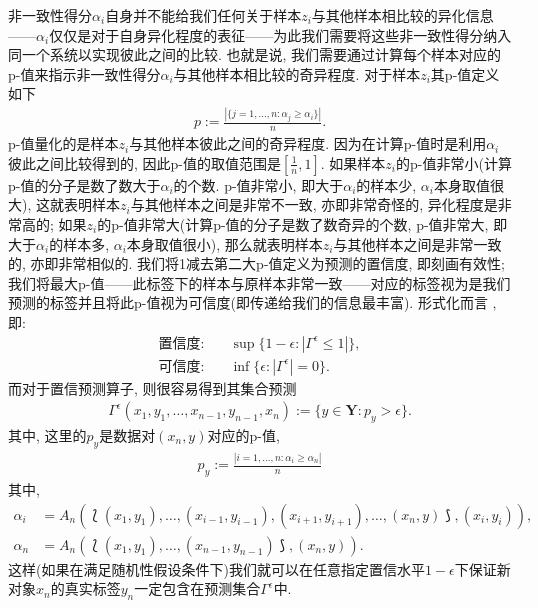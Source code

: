 非一致性得分$\alpha_{i}$自身并不能给我们任何关于样本$z_{i}$与其他样本相比较的异化信息——$\alpha_{i}$仅仅是对于自身异化程度的表征——为此我们需要将这些非一致性得分纳入同一个系统以实现彼此之间的比较. 也就是说, 我们需要通过计算每个样本对应的p-值来指示非一致性得分$\alpha_{i}$与其他样本相比较的奇异程度. 对于样本$z_{i}$其p-值定义如下
\begin{align}
\label{p-value}
p := \frac{|\{j = 1, \ldots, n: \alpha_{j} \geq \alpha_{i}\}|}{n}.
\end{align}
p-值量化的是样本$z_{i}$与其他样本彼此之间的奇异程度. 因为在计算p-值时是利用$\alpha_{i}$彼此之间比较得到的, 因此p-值的取值范围是$[\frac{1}{n}, 1]$. 如果样本$z_{i}$的p-值非常小(计算p-值的分子是数了数大于$\alpha_{i}$的个数. p-值非常小, 即大于$\alpha_{i}$的样本少, $\alpha_{i}$本身取值很大), 这就表明样本$z_{i}$与其他样本之间是非常不一致, 亦即非常奇怪的, 异化程度是非常高的; 如果$z_{i}$的p-值非常大(计算p-值的分子是数了数奇异的个数, p-值非常大, 即大于$\alpha_{i}$的样本多, $\alpha_{i}$本身取值很小), 那么就表明样本$z_{i}$与其他样本之间是非常一致的, 亦即非常相似的. 我们将1减去第二大p-值定义为预测的置信度, 即刻画有效性; 我们将最大p-值——此标签下的样本与原样本非常一致——对应的标签视为是我们预测的标签并且将此p-值视为可信度(即传递给我们的信息最丰富). 形式化而言 \citep{2006Hedging}, 即:
\begin{align}
\label{confidence-credibility}
\textsf{置信度:} \quad &\sup\{1-\epsilon: |\Gamma^{\epsilon} \leq 1|\}, \\
\textsf{可信度:} \quad &\inf\{\epsilon: |\Gamma^{\epsilon}| = 0\}.
\end{align}
而对于置信预测算子, 则很容易得到其集合预测
\begin{align}
\Gamma^{\epsilon}(x_{1}, y_{1}, \ldots, x_{n-1}, y_{n-1}, x_{n}) := \{y \in \mathbf{Y}: p_{y} > \epsilon\}.
\end{align}
其中, 这里的$p_{y}$是数据对$(x_{n}, y)$对应的p-值, 
\begin{align}
\label{definition-of-py}
p_{y} := \frac{|i = 1, \ldots, n: \alpha_{i} \geq \alpha_{n}|}{n}
\end{align}
其中,
\begin{align*}
\alpha_{i} &= A_{n}(\Lbag (x_{1}, y_{1}), \ldots, (x_{i-1}, y_{i-1}), (x_{i+1}, y_{i+1}), \ldots, (x_{n}, y) \Rbag, (x_{i}, y_{i})),\\
\alpha_{n} &= A_{n}(\Lbag (x_{1}, y_{1}), \ldots, (x_{n-1}, y_{n-1}) \Rbag, (x_{n}, y)).
\end{align*}
这样(如果在满足随机性假设条件下)我们就可以在任意指定置信水平$1 - \epsilon$下保证新对象$x_{n}$的真实标签$y_{n}$一定包含在预测集合$\Gamma^{\epsilon}$中.

